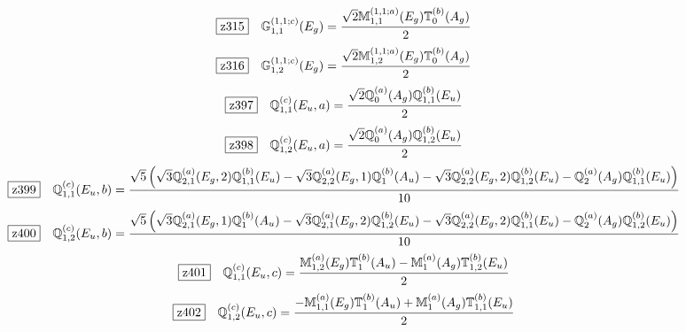 \documentclass[fleqn,10pt,landscape]{jsarticle}
\begin{document}
\begin{dmath*}
\hspace*{3mm}\fbox{z315}\quad \mathbb{G}_{1,1}^{(1,1;c)}(E_{g})=\frac{\sqrt{2} \mathbb{M}_{1,1}^{(1,1;a)}(E_{g}) \mathbb{T}_{0}^{(b)}(A_{g})}{2}
\end{dmath*}
\begin{dmath*}
\hspace*{3mm}\fbox{z316}\quad \mathbb{G}_{1,2}^{(1,1;c)}(E_{g})=\frac{\sqrt{2} \mathbb{M}_{1,2}^{(1,1;a)}(E_{g}) \mathbb{T}_{0}^{(b)}(A_{g})}{2}
\end{dmath*}
\begin{dmath*}
\hspace*{3mm}\fbox{z397}\quad \mathbb{Q}_{1,1}^{(c)}(E_{u},a)=\frac{\sqrt{2} \mathbb{Q}_{0}^{(a)}(A_{g}) \mathbb{Q}_{1,1}^{(b)}(E_{u})}{2}
\end{dmath*}
\begin{dmath*}
\hspace*{3mm}\fbox{z398}\quad \mathbb{Q}_{1,2}^{(c)}(E_{u},a)=\frac{\sqrt{2} \mathbb{Q}_{0}^{(a)}(A_{g}) \mathbb{Q}_{1,2}^{(b)}(E_{u})}{2}
\end{dmath*}
\begin{dmath*}
\hspace*{3mm}\fbox{z399}\quad \mathbb{Q}_{1,1}^{(c)}(E_{u},b)=\frac{\sqrt{5} \left(\sqrt{3} \mathbb{Q}_{2,1}^{(a)}(E_{g},2) \mathbb{Q}_{1,1}^{(b)}(E_{u}) - \sqrt{3} \mathbb{Q}_{2,2}^{(a)}(E_{g},1) \mathbb{Q}_{1}^{(b)}(A_{u}) - \sqrt{3} \mathbb{Q}_{2,2}^{(a)}(E_{g},2) \mathbb{Q}_{1,2}^{(b)}(E_{u}) - \mathbb{Q}_{2}^{(a)}(A_{g}) \mathbb{Q}_{1,1}^{(b)}(E_{u})\right)}{10}
\end{dmath*}
\begin{dmath*}
\hspace*{3mm}\fbox{z400}\quad \mathbb{Q}_{1,2}^{(c)}(E_{u},b)=\frac{\sqrt{5} \left(\sqrt{3} \mathbb{Q}_{2,1}^{(a)}(E_{g},1) \mathbb{Q}_{1}^{(b)}(A_{u}) - \sqrt{3} \mathbb{Q}_{2,1}^{(a)}(E_{g},2) \mathbb{Q}_{1,2}^{(b)}(E_{u}) - \sqrt{3} \mathbb{Q}_{2,2}^{(a)}(E_{g},2) \mathbb{Q}_{1,1}^{(b)}(E_{u}) - \mathbb{Q}_{2}^{(a)}(A_{g}) \mathbb{Q}_{1,2}^{(b)}(E_{u})\right)}{10}
\end{dmath*}
\begin{dmath*}
\hspace*{3mm}\fbox{z401}\quad \mathbb{Q}_{1,1}^{(c)}(E_{u},c)=\frac{\mathbb{M}_{1,2}^{(a)}(E_{g}) \mathbb{T}_{1}^{(b)}(A_{u}) - \mathbb{M}_{1}^{(a)}(A_{g}) \mathbb{T}_{1,2}^{(b)}(E_{u})}{2}
\end{dmath*}
\begin{dmath*}
\hspace*{3mm}\fbox{z402}\quad \mathbb{Q}_{1,2}^{(c)}(E_{u},c)=\frac{- \mathbb{M}_{1,1}^{(a)}(E_{g}) \mathbb{T}_{1}^{(b)}(A_{u}) + \mathbb{M}_{1}^{(a)}(A_{g}) \mathbb{T}_{1,1}^{(b)}(E_{u})}{2}
\end{dmath*}
\end{document}
